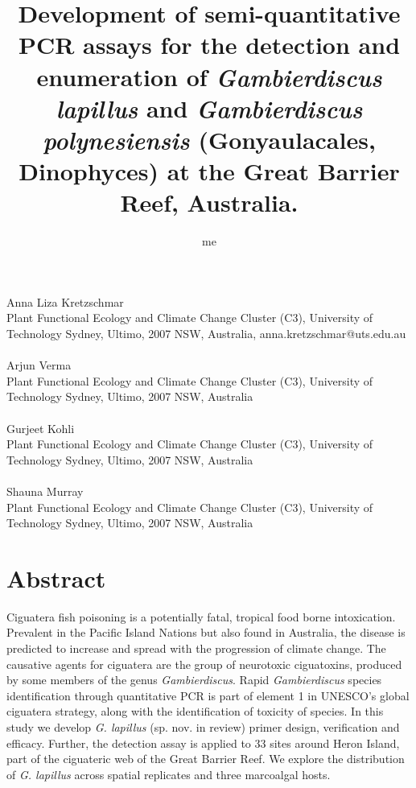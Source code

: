 \documentclass[12pt]{article}
\title{Development of semi-quantitative PCR assays for the detection and enumeration of \emph{Gambierdiscus lapillus} and \emph{Gambierdiscus polynesiensis} (Gonyaulacales, Dinophyces) at the Great Barrier Reef, Australia.}
\author{me}
\date{}
\begin{document}
\maketitle
\paragraph{}Anna Liza Kretzschmar\\
Plant Functional Ecology and Climate Change Cluster (C3), University of Technology Sydney, Ultimo, 2007 NSW, Australia, anna.kretzschmar@uts.edu.au
\paragraph{}Arjun Verma \\
Plant Functional Ecology and Climate Change Cluster (C3), University of Technology Sydney, Ultimo, 2007 NSW, Australia
\paragraph{}Gurjeet Kohli\\
Plant Functional Ecology and Climate Change Cluster (C3), University of Technology Sydney, Ultimo, 2007 NSW, Australia
\paragraph{}Shauna Murray\\
Plant Functional Ecology and Climate Change Cluster (C3), University of Technology Sydney, Ultimo, 2007 NSW, Australia
\newpage
\section{Abstract}
Ciguatera fish poisoning is a potentially fatal, tropical food borne intoxication. Prevalent in the Pacific Island Nations but also found in Australia, the disease is predicted to increase and spread with the progression of climate change. The causative agents for ciguatera are the group of neurotoxic ciguatoxins, produced by some members of the genus \emph{Gambierdiscus}. Rapid \emph{Gambierdiscus} species identification through quantitative PCR is part of element 1 in UNESCO's global ciguatera strategy, along with the identification of toxicity of species. In this study we develop \emph{G. lapillus} (sp. nov. in review) primer design, verification and efficacy. Further, the detection assay is applied to 33 sites around Heron Island, part of the ciguateric web of the Great Barrier Reef. We explore the distribution of \emph{G. lapillus} across spatial replicates and three marcoalgal hosts. 
\end{document}
